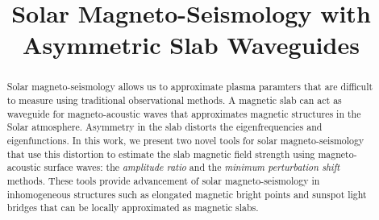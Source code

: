 \documentclass[namedreferences]{solarphysics}
\numberwithin{equation}{section}
\begin{document}
\begin{article}

\begin{opening}

\title{Solar Magneto-Seismology with Asymmetric Slab Waveguides}

\author[addressref={UoS},email={}]{}

\author[addressref={UoS},corref,email={robertus@sheffield.ac.uk}]{}

%

\address[id={UoS}]{Solar Physics and Space Plasma Research Centre, School of Mathematics and Statistics, University of Sheffield, Hicks Building, Hounsfield Road, Sheffield, S3 7RH, UK.}


\begin{abstract}
Solar magneto-seismology allows us to approximate plasma paramters that are difficult to measure using traditional observational methods. A magnetic slab can act as waveguide for magneto-acoustic waves that approximates magnetic structures in the Solar atmosphere. Asymmetry in the slab distorts the eigenfrequencies and eigenfunctions. In this work, we present two novel tools for solar magneto-seismology that use this distortion to estimate the slab magnetic field strength using magneto-acoustic surface waves: the \emph{amplitude ratio} and the \emph{minimum perturbation shift} methods. These tools provide advancement of solar magneto-seismology in inhomogeneous structures such as elongated magnetic bright points and sunspot light bridges that can be locally approximated as magnetic slabs.
\end{abstract}

\end{opening}


\end{article}
\end{document}
